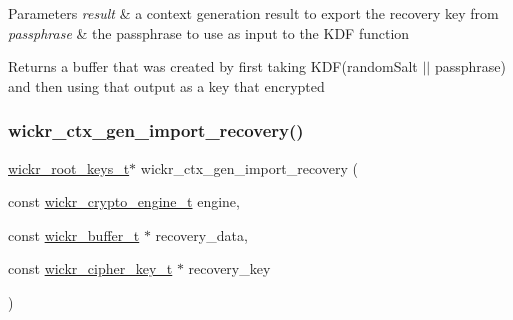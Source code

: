 \begin{DoxyParams}{Parameters}
{\em result} & a context generation result to export the recovery key from \\
\hline
{\em passphrase} & the passphrase to use as input to the K\+DF function \\
\hline
\end{DoxyParams}
\begin{DoxyReturn}{Returns}
a buffer that was created by first taking K\+DF(random\+Salt $\vert$$\vert$ passphrase) and then using that output as a key that encrypted 
\end{DoxyReturn}
\mbox{\label{group__wickr__ctx_ga0bde95494141673604b9e4e1f7954e2c}} 
\subsubsection{\texorpdfstring{wickr\+\_\+ctx\+\_\+gen\+\_\+import\+\_\+recovery()}{wickr\_ctx\_gen\_import\_recovery()}}
{\footnotesize\ttfamily \mbox{\hyperlink{structwickr__root__keys}{wickr\+\_\+root\+\_\+keys\+\_\+t}}$\ast$ wickr\+\_\+ctx\+\_\+gen\+\_\+import\+\_\+recovery (\begin{DoxyParamCaption}\item[{const \mbox{\hyperlink{structwickr__crypto__engine}{wickr\+\_\+crypto\+\_\+engine\+\_\+t}}}]{engine,  }\item[{const \mbox{\hyperlink{structwickr__buffer}{wickr\+\_\+buffer\+\_\+t}} $\ast$}]{recovery\+\_\+data,  }\item[{const \mbox{\hyperlink{structwickr__cipher__key}{wickr\+\_\+cipher\+\_\+key\+\_\+t}} $\ast$}]{recovery\+\_\+key }\end{DoxyParamCaption})}


